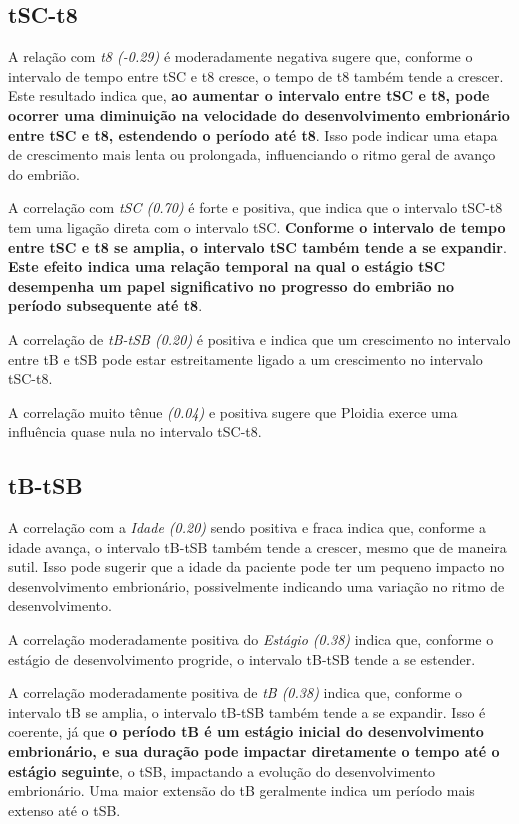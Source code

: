 \subsection*{tSC-t8}
A relação com \textit{t8 (-0.29)} é moderadamente negativa sugere que, conforme o intervalo de tempo entre tSC e t8 cresce, o tempo de t8 também tende a crescer. Este resultado indica que,\textbf{ ao aumentar o intervalo entre tSC e t8, pode ocorrer uma diminuição na velocidade do desenvolvimento embrionário entre tSC e t8, estendendo o período até t8}. Isso pode indicar uma etapa de crescimento mais lenta ou prolongada, influenciando o ritmo geral de avanço do embrião.

A correlação com \textit{tSC (0.70)} é forte e positiva, que indica que o intervalo tSC-t8 tem uma ligação direta com o intervalo tSC. \textbf{Conforme o intervalo de tempo entre tSC e t8 se amplia, o intervalo tSC também tende a se expandir}. \textbf{Este efeito indica uma relação temporal na qual o estágio tSC desempenha um papel significativo no progresso do embrião no período subsequente até t8}.

A correlação de \textit{tB-tSB (0.20)} é positiva e indica que um crescimento no intervalo entre tB e tSB pode estar estreitamente ligado a um crescimento no intervalo tSC-t8. 

A correlação muito tênue \textit{(0.04)} e positiva sugere que Ploidia exerce uma influência quase nula no intervalo tSC-t8. 

\subsection*{tB-tSB}
A correlação com a \textit{Idade (0.20)} sendo positiva e fraca indica que, conforme a idade avança, o intervalo tB-tSB também tende a crescer, mesmo que de maneira sutil. Isso pode sugerir que a idade da paciente pode ter um pequeno impacto no desenvolvimento embrionário, possivelmente indicando uma variação no ritmo de desenvolvimento.

A correlação moderadamente positiva do \textit{Estágio (0.38)} indica que, conforme o estágio de desenvolvimento progride, o intervalo tB-tSB tende a se estender. 

A correlação moderadamente positiva de \textit{tB (0.38)} indica que, conforme o intervalo tB se amplia, o intervalo tB-tSB também tende a se expandir. Isso é coerente, já que \textbf{o período tB é um estágio inicial do desenvolvimento embrionário, e sua duração pode impactar diretamente o tempo até o estágio seguinte}, o tSB, impactando a evolução do desenvolvimento embrionário. Uma maior extensão do tB geralmente indica um período mais extenso até o tSB.

